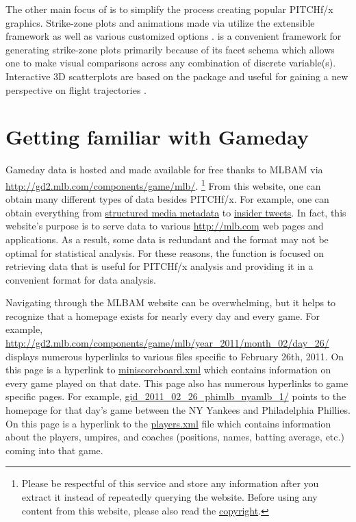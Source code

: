 \documentclass[a4paper]{report}\usepackage[]{graphicx}\usepackage[]{color}
\begin{document}
\begin{article}
The other main focus of  is to simplify the process
creating popular PITCHf/x graphics. Strike-zone plots and animations
made via  utilize the extensible 
framework as well as various customized options \citep{ggplot2}.
 is a convenient framework for generating strike-zone
plots primarily because of its facet schema which allows one to make
visual comparisons across any combination of discrete variable(s).
Interactive 3D scatterplots are based on the  package
and useful for gaining a new perspective on flight trajectories \citep{rgl}.


\section{Getting familiar with Gameday}

Gameday data is hosted and made available for free thanks to MLBAM
via \url{http://gd2.mlb.com/components/game/mlb/}.%
\footnote{Please be respectful of this service and store any information after
you extract it instead of repeatedly querying the website. Before
using any content from this website, please also read the \href{http://gdx.mlb.com/components/copyright.txt}{copyright}.%
} From this website, one can obtain many different types of data besides
PITCHf/x. For example, one can obtain everything from \href{http://gd2.mlb.com/components/game/mlb/year_2013/month_07/day_16/gid_2013_07_16_aasmlb_nasmlb_1/media/instadium.xml}{structured media metadata}
to \href{http://gd2.mlb.com/components/game/mlb/twitter/anaInsiderTweets.xml}{insider tweets}.
In fact, this website's purpose is to serve data to various \url{http://mlb.com}
web pages and applications. As a result, some data is redundant and
the format may not be optimal for statistical analysis. For these
reasons, the  function is focused on retrieving data
that is useful for PITCHf/x analysis and providing it in a convenient
format for data analysis. 

Navigating through the MLBAM website can be overwhelming, but it helps
to recognize that a homepage exists for nearly every day and every
game. For example, \url{http://gd2.mlb.com/components/game/mlb/year_2011/month_02/day_26/}
displays numerous hyperlinks to various files specific to February
26th, 2011. On this page is a hyperlink to \href{http://gd2.mlb.com/components/game/mlb/year_2011/month_02/day_26/miniscoreboard.xml}{miniscoreboard.xml}
which contains information on every game played on that date. This
page also has numerous hyperlinks to game specific pages. For example,
\href{http://gd2.mlb.com/components/game/mlb/year_2011/month_02/day_26/gid_2011_02_26_phimlb_nyamlb_1/}{gid\_2011\_02\_26\_phimlb\_nyamlb\_1/}
points to the homepage for that day's game between the NY Yankees
and Philadelphia Phillies. On this page is a hyperlink to the \href{http://gd2.mlb.com/components/game/mlb/year_2011/month_02/day_26/gid_2011_02_26_phimlb_nyamlb_1/players.xml}{players.xml}
file which contains information about the players, umpires, and coaches
(positions, names, batting average, etc.) coming into that game. 


\end{article}
\end{document}

